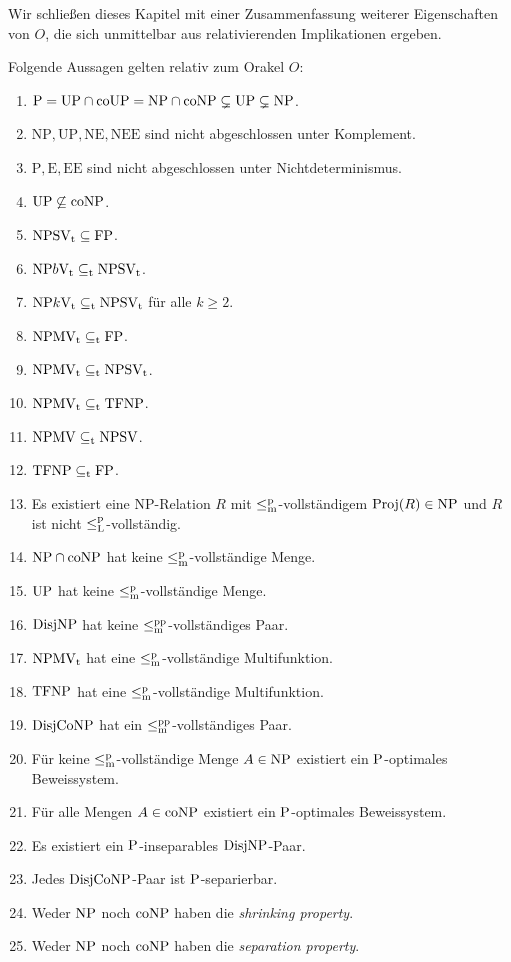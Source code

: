 Wir schließen dieses Kapitel mit einer Zusammenfassung weiterer Eigenschaften von $O$, die sich unmittelbar aus relativierenden Implikationen ergeben.
\begin{corollary}
    Folgende Aussagen gelten relativ zum Orakel $O$:
    \begin{enumerate}[noitemsep,midpenalty=0]
        \item $\P=\UP\cap\coUP=\NP\cap\coNP\subsetneq \UP \subsetneq \NP$.
        \item $\mathrm{NP, UP, NE, NEE}$ sind nicht abgeschlossen unter Komplement. 
        \item $\mathrm{P, E, EE}$ sind nicht abgeschlossen unter Nichtdeterminismus.
        \item $\UP\not\subseteq \coNP$.
        \item $\NPSVt\subseteq\FP$.
        \item $\mathrm{NP}b\mathrm{V_t} \subseteq_{\mathrm{t}} \NPSVt$.
        \item $\mathrm{NP}k\mathrm{V_t} \subseteq_{\mathrm{t}} \NPSVt$ für alle $k\geq 2$.
        \item $\NPMVt \subseteq_{\mathrm{t}} \FP$.
        \item $\NPMVt \subseteq_{\mathrm{t}} \NPSVt$.
        \item $\NPMVt \subseteq_{\mathrm{t}} \TFNP$.
        \item $\mathrm{NPMV} \subseteq_{\mathrm{t}} \NPSV$.
        \item $\TFNP\subseteq_{\mathrm{t}} \FP$.
        \item Es existiert eine NP-Relation $R$ mit $\leqmp$-vollständigem $\Proj(R)\in\NP$ und $R$ ist nicht $\leqlp$-vollständig.
        \item $\NP\cap\coNP$ hat keine $\leqmp$-vollständige Menge.
        \item $\UP$ hat keine $\leqmp$-vollständige Menge.
        \item $\DisjNP$ hat keine $\leqmpp$-vollständiges Paar.
        \item $\NPMVt$ hat eine $\leqmp$-vollständige Multifunktion.
        \item $\TFNP$ hat eine $\leqmp$-vollständige Multifunktion.
        \item $\DisjCoNP$ hat ein $\leqmpp$-vollständiges Paar.
        \item Für keine $\leqmp$-vollständige Menge $A\in\NP$ existiert ein $\P$-optimales Beweissystem.
        \item Für alle Mengen $A\in\coNP$ existiert ein $\P$-optimales Beweissystem.
        \item Es existiert ein $\P$-inseparables $\DisjNP$-Paar.
        \item Jedes $\DisjCoNP$-Paar ist $\P$-separierbar.
        \item Weder $\NP$ noch $\coNP$ haben die \emph{shrinking property}.
        \item Weder $\NP$ noch $\coNP$ haben die \emph{separation property}.
    \end{enumerate}
\end{corollary}




